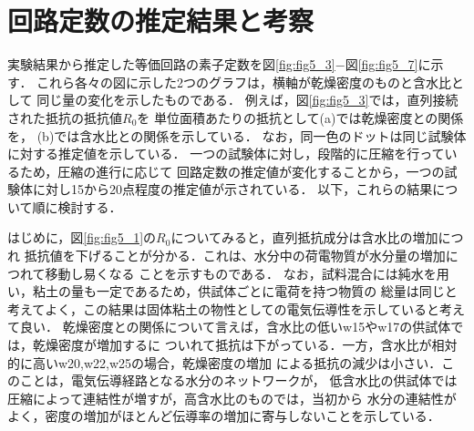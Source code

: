 \section{回路定数の推定結果と考察}
実験結果から推定した等価回路の素子定数を図\ref{fig:fig5_3}−図\ref{fig:fig5_7}に示す．
これら各々の図に示した2つのグラフは，横軸が乾燥密度のものと含水比として
同じ量の変化を示したものである．
例えば，図\ref{fig:fig5_3}では，直列接続された抵抗の抵抗値$R_0$を
単位面積あたりの抵抗として(a)では乾燥密度との関係を，
(b)では含水比との関係を示している．
なお，同一色のドットは同じ試験体に対する推定値を示している．
一つの試験体に対し，段階的に圧縮を行っているため，圧縮の進行に応じて
回路定数の推定値が変化することから，一つの試験体に対し15から20点程度の推定値が示されている．
以下，これらの結果について順に検討する．

はじめに，図\ref{fig:fig5_1}の$R_0$についてみると，直列抵抗成分は含水比の増加につれ
抵抗値を下げることが分かる．これは、水分中の荷電物質が水分量の増加につれて移動し易くなる
ことを示すものである．
なお，試料混合には純水を用い，粘土の量も一定であるため，供試体ごとに電荷を持つ物質の
総量は同じと考えてよく，この結果は固体粘土の物性としての電気伝導性を示していると考えて良い．
乾燥密度との関係について言えば，含水比の低いw15やw17の供試体では，乾燥密度が増加するに
ついれて抵抗は下がっている．一方，含水比が相対的に高いw20,w22,w25の場合，乾燥密度の増加
による抵抗の減少は小さい．このことは，電気伝導経路となる水分のネットワークが，
低含水比の供試体では圧縮によって連結性が増すが，高含水比のものでは，当初から
水分の連結性がよく，密度の増加がほとんど伝導率の増加に寄与しないことを示している．

